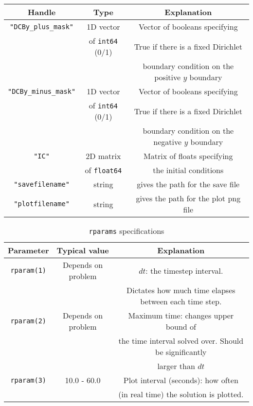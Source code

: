\documentclass[11pt]{article}
\begin{document}
    \begin{table}
        \centering
        \begin{tabular}{c | c | c}
            Handle & Type & Explanation\\
            \hline
            \texttt{"DCBy\_plus\_mask"} & 1D vector & Vector of booleans specifying \\
            & of \texttt{int64} (0/1) & True if there is a fixed Dirichlet \\
            & & boundary condition on the positive \(y\) boundary \\
            \hline
            \texttt{"DCBy\_minus\_mask"} & 1D vector & Vector of booleans specifying \\
            & of \texttt{int64} (0/1) & True if there is a fixed Dirichlet \\
            & & boundary condition on the negative \(y\) boundary \\
            \hline
            \texttt{"IC"} & 2D matrix & Matrix of floats specifying \\
            & of \texttt{float64} & the initial conditions\\
            \hline
            \texttt{"savefilename"} & string & gives the path for the save file \\
            \hline
            \texttt{"plotfilename"} & string & gives the path for the plot png file
        \end{tabular}
    \end{table}


    \begin{table}
        \centering
        \caption{\texttt{rparams} specifications}
        \label{tab:rparams}
        \begin{tabular}{c | c | c}
            Parameter & Typical value & Explanation\\
            \hline
            \texttt{rparam(1)} & Depends on problem & \(dt\): the timestep interval.\\
            & & Dictates how much time elapses between each time step.\\
            \hline
            \texttt{rparam(2)} & Depends on problem & Maximum time: changes upper bound of\\
            & &  the time interval solved over. Should be significantly\\
            & &  larger than \(dt\)\\
            \hline
            \texttt{rparam(3)} & 10.0 - 60.0 & Plot interval (seconds): how often\\
            & &  (in real time) the solution is plotted.\\
        \end{tabular}
    \end{table}
\end{document}
